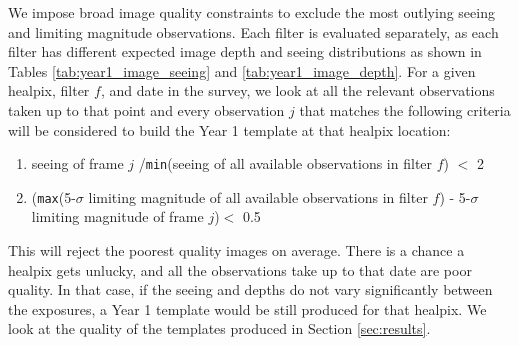 \documentclass[preprint,linenumbers]{aastex631}
\begin{document}
	We impose broad image quality constraints to exclude the most outlying seeing and limiting magnitude observations. Each filter is evaluated separately, as each filter has different expected image depth and seeing distributions as shown in Tables \ref{tab:year1_image_seeing} and  \ref{tab:year1_image_depth}. 
	For a given healpix, filter $f$, and date in the survey, we look at all the relevant observations taken up to that point and  every observation $j$ that matches the following criteria will be considered to build the Year 1 template at that healpix location: 
	\begin{enumerate}
		\item seeing of frame $j$ /\texttt{min}(seeing of all available observations in filter $f$) $<$ 2
		\item (\texttt{max}(5-$\sigma$ limiting magnitude of all available observations in filter $f$) -  5-$\sigma$ limiting magnitude of frame $j$)$<$ 0.5
	\end{enumerate}
	This will reject the poorest quality images on average. There is a chance a healpix gets unlucky, and all the observations take up to that date are poor quality. In that case, if the seeing and depths do not vary significantly between the exposures, a Year 1 template would be still produced for that healpix. We look at the quality of the templates produced in Section \ref{sec:results}.
	
\end{document}

